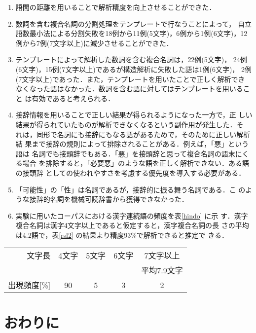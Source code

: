 \begin{enumerate}
\item 語間の距離を用いることで解析精度を向上させることができた．
\item 数詞を含む複合名詞の分割処理をテンプレートで行なうことによって，
自立語数最小法による分割失敗を18例から11例(5文字)，6例から1例(6文字)，12
例から7例(7文字以上)に減少させることができた．
\end{enumerate}


\begin{enumerate}
\setcounter{enumi}{2}
\item テンプレートによって解析した数詞を含む複合名詞は，22例(5文字)，
24例(6文字)，15例(7文字以上)であるが構造解析に失敗した語は1例(6文字)，
2例(7文字以上)であった．また，テンプレートを用いたことで正しく解析でき
なくなった語はなかった．数詞を含む語に対してはテンプレートを用いること
は有効であると考えられる．
\item 接辞情報を用いることで正しい結果が得られるようになった一方で，正
しい結果が得られていたものが解析できなくなるという副作用が発生した．そ
れは，同形で名詞にも接辞にもなる語があるためで，そのために正しい解析結
果まで接辞の規則によって排除されることがある．例えば，「悪」という語は
名詞でも接頭辞でもある．「悪」を接頭辞と思って複合名詞の語末にくる場合
を排除すると，「必要悪」のような語を正しく解析できない．ある語の接頭辞
としての使われやすさを考慮する優先度を導入する必要がある．
\item 「可能性」の「性」は名詞であるが，接辞的に振る舞う名詞である．こ
のような接辞的名詞を機械可読辞書から獲得できなかった．
\item 実験に用いたコーパスにおける漢字連続語の頻度を表\ref{hindo} に示
す．漢字複合名詞は漢字4文字以上であると仮定すると，漢字複合名詞の長
さの平均は4.2語で，表\ref{rsl2} の結果より精度93\%で解析できると推定で
きる．
\end{enumerate}


\begin{center}
  \begin{tabular}{|r|c|c|c|c|}
    \hline
    文字長 & 4文字 & 5文字 & 6文字 & 7文字以上\\
    &&&&平均7.9文字\\
    \hline
    出現頻度[\%] & 90 & 5 & 3 & 2 \\
    \hline
  \end{tabular}
\end{center}

\section{おわりに}

